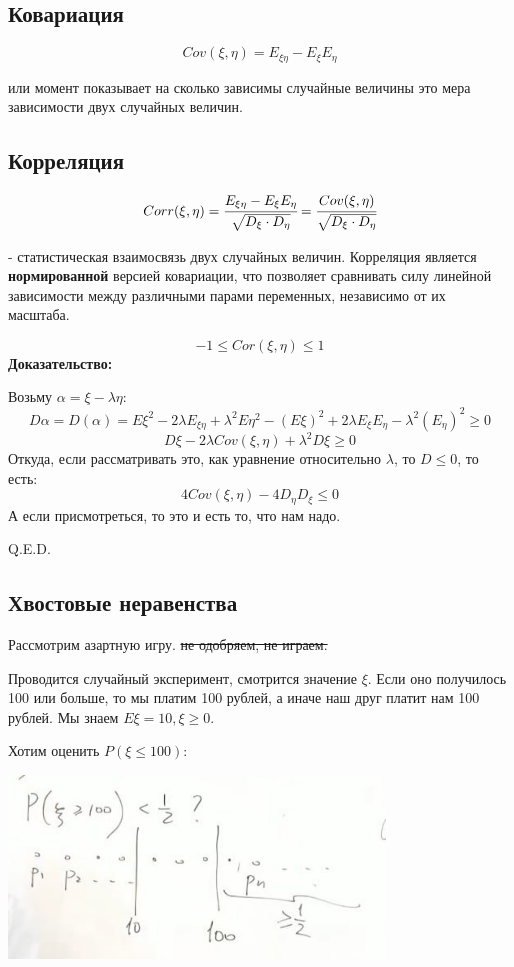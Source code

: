 \subsection{Ковариация}

$$Cov(\xi,\eta) =E_{\xi \eta} -  E_{\xi}E_{\eta}$$

 или  момент показывает на сколько зависимы случайные величины это мера зависимости двух случайных величин.

\subsection{Корреляция}

$$Corr(\xi,\eta) =\cfrac{E_{\xi \eta} -  E_{\xi}E_{\eta}}{\sqrt{D_{\xi}\cdot D_{\eta}}} = \cfrac{Cov(\xi,\eta)}{\sqrt{D_{\xi}\cdot D_{\eta}}}$$

 - статистическая взаимосвязь двух случайных величин. Корреляция является \textbf{нормированной} версией ковариации, что позволяет сравнивать силу линейной зависимости между различными парами переменных, независимо от их масштаба.

$$-1\leq Cor(\xi,\eta)\leq 1$$
\textbf{Доказательство:}

Возьму $\alpha = \xi - \lambda \eta$:
$$D\alpha = D(\alpha) = E\xi^2 - 2\lambda E_{\xi\eta} + \lambda^2E \eta^2-(E\xi)^2 + 2\lambda E_{\xi}E_{\eta}-\lambda^2(E_\eta)^2\geq 0$$
$$D\xi - 2\lambda Cov(\xi,\eta) + \lambda^2 D\xi \geq 0$$
Откуда, если рассматривать это, как уравнение относительно $\lambda$, то $D\leq 0 $, то есть:
$$4Cov(\xi,\eta) - 4 D_{\eta}D_{\xi}\leq 0$$
А если присмотреться, то это и есть то, что нам надо.

\hfill Q.E.D.

\subsection{Хвостовые неравенства}

Рассмотрим азартную игру. \sout{не одобряем, не играем.} 

Проводится случайный эксперимент, смотрится значение $\xi$. Если оно получилось 100 или больше, то мы платим 100 рублей, а иначе наш друг платит нам 100 рублей. Мы знаем $ E\xi = 10, \xi\geq 0$.

Хотим оценить $P(\xi\leq 100)$:
\begin{center}
    \includegraphics[width = 10cm]{assets/3_3_1.jpg}
\end{center}

